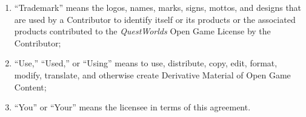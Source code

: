 \documentclass[
]{article}
\begin{document}
\begin{enumerate}
{  Pendragon}, \emph{Magic World}, \emph{Nephilim}, \emph{Prince
  Valiant}, \emph{Ringworld}, \emph{RuneQuest}, \emph{7th Sea},
  \emph{Stormbringer}, \emph{Superworld}, \emph{Thieves' World},
  \emph{Worlds of Wonder}, and any related sublines; the world and
  mythology of Glorantha; all works related to the Cthulhu Mythos,
  including those that are otherwise public domain; and all works
  related to \emph{Le Morte d'Arthur}. This list may be updated in
  future versions of the License.
\item
  ``Trademark'' means the logos, names, marks, signs, mottos, and
  designs that are used by a Contributor to identify itself or its
  products or the associated products contributed to the
  \emph{QuestWorlds} Open Game License by the Contributor;
\item
  ``Use,'' ``Used,'' or ``Using'' means to use, distribute, copy, edit,
  format, modify, translate, and otherwise create Derivative Material of
  Open Game Content;
\item
  ``You'' or ``Your'' means the licensee in terms of this agreement.
\end{enumerate}
\end{document}

